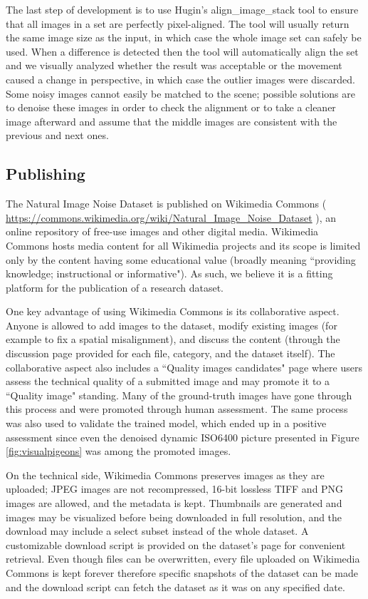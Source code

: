 The last step of development is to use Hugin's align\_image\_stack tool \cite{hugin} to ensure that all images in a set are perfectly pixel-aligned. The tool will usually return the same image size as the input, in which case the whole image set can safely be used. When a difference is detected then the tool will automatically align the set and we visually analyzed whether the result was acceptable or the movement caused a change in perspective, in which case the outlier images were discarded. Some noisy images cannot easily be matched to the scene; possible solutions are to denoise these images in order to check the alignment or to take a cleaner image afterward and assume that the middle images are consistent with the previous and next ones.
\subsection{Publishing}
The Natural Image Noise Dataset is published on Wikimedia Commons ( \url{https://commons.wikimedia.org/wiki/Natural_Image_Noise_Dataset} ), an online repository of free-use images and other digital media. Wikimedia Commons hosts media content for all Wikimedia projects and its scope is limited only by the content having some educational value (broadly meaning ``providing knowledge; instructional or informative"). As such, we believe it is a fitting platform for the publication of a research dataset.

One key advantage of using Wikimedia Commons is its collaborative aspect. Anyone is allowed to add images to the dataset, modify existing images (for example to fix a spatial misalignment), and discuss the content (through the discussion page provided for each file, category, and the dataset itself). The collaborative aspect also includes a ``Quality images candidates" page \cite{qic} where users assess the technical quality of a submitted image and may promote it to a ``Quality image" standing. Many of the ground-truth images have gone through this process and were promoted through human assessment. The same process was also used to validate the trained model, which ended up in a positive assessment since even the denoised dynamic ISO6400 picture presented in Figure \ref{fig:visualpigeons} was among the promoted images.

On the technical side, Wikimedia Commons preserves images as they are uploaded; JPEG images are not recompressed, 16-bit lossless TIFF and PNG images are allowed, and the metadata is kept. Thumbnails are generated and images may be visualized before being downloaded in full resolution, and the download may include a select subset instead of the whole dataset. A customizable download script is provided on the dataset's page for convenient retrieval. Even though files can be overwritten, every file uploaded on Wikimedia Commons is kept forever therefore specific snapshots of the dataset can be made and the download script can fetch the dataset as it was on any specified date.

